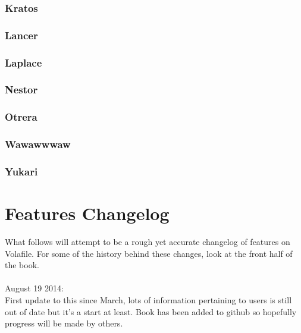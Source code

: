 \documentclass[12pt]{report}
\begin{document}
{{        \subsection{Kratos}
        \subsection{Lancer}
        \subsection{Laplace}
        \subsection{Nestor}
        \subsection{Otrera}
        \subsection{Wawawwwaw}
        \subsection{Yukari}

        \chapter{Features Changelog}
        What follows will attempt to be a rough yet accurate changelog of features on Volafile.
        For some of the history behind these changes, look at the front half of the book.\\\\
        August 19 2014:\\
        First update to this since March, lots of information pertaining to users is still
        out of date but it's a start at least. Book has been added to github so hopefully
        progress will be made by others.
    }
}
\end{document}

